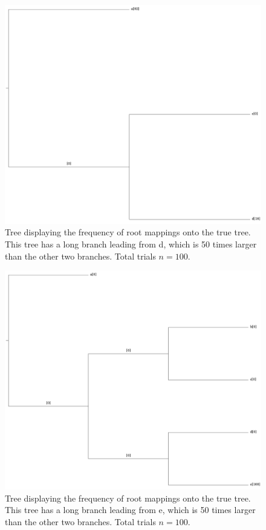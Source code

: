\documentclass{article}
\begin{document}
\begin{figure}
  \includegraphics[width=.9\linewidth]{figs/lba_tree2.png}
  \caption{Tree displaying the frequency of root mappings onto the true tree.
  This tree has a long branch leading from d, which is 50 times larger than the
  other two branches. Total trials $n=100$.}
  \label{fig:lba_tree}
\end{figure}

\begin{figure}
  \includegraphics[width=.9\linewidth]{figs/lba_tree4.png}
  \caption{Tree displaying the frequency of root mappings onto the true tree.
  This tree has a long branch leading from e, which is 50 times larger than the
  other two branches. Total trials $n=100$.}
  \label{fig:lba_tree2}
\end{figure}
\end{document}
